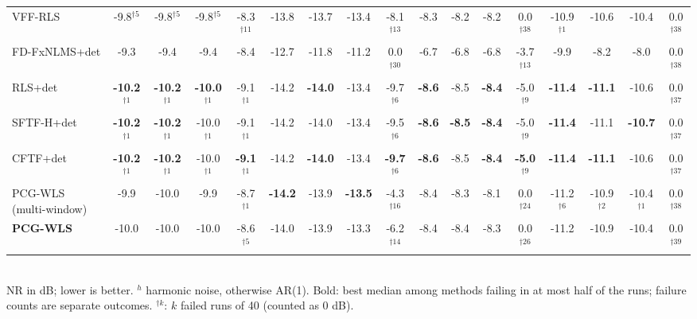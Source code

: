 \begin{table}[t]
{\begin{tabular}{lcccccccccccccccc}
VFF-RLS & -9.8$^{\dagger5}$ & -9.8$^{\dagger5}$ & -9.8$^{\dagger5}$ & -8.3$^{\dagger11}$ & -13.8 & -13.7 & -13.4 & -8.1$^{\dagger13}$ & -8.3 & -8.2 & -8.2 & 0.0$^{\dagger38}$ & -10.9$^{\dagger1}$ & -10.6 & -10.4 & 0.0$^{\dagger38}$ \\
FD-FxNLMS+det & -9.3 & -9.4 & -9.4 & -8.4 & -12.7 & -11.8 & -11.2 & 0.0$^{\dagger30}$ & -6.7 & -6.8 & -6.8 & -3.7$^{\dagger13}$ & -9.9 & -8.2 & -8.0 & 0.0$^{\dagger38}$ \\
RLS+det & \textbf{-10.2$^{\dagger1}$} & \textbf{-10.2$^{\dagger1}$} & \textbf{-10.0$^{\dagger1}$} & -9.1$^{\dagger1}$ & -14.2 & \textbf{-14.0} & -13.4 & -9.7$^{\dagger6}$ & \textbf{-8.6} & -8.5 & \textbf{-8.4} & -5.0$^{\dagger9}$ & \textbf{-11.4} & \textbf{-11.1} & -10.6 & 0.0$^{\dagger37}$ \\
SFTF-H+det & \textbf{-10.2$^{\dagger1}$} & \textbf{-10.2$^{\dagger1}$} & -10.0$^{\dagger1}$ & -9.1$^{\dagger1}$ & -14.2 & -14.0 & -13.4 & -9.5$^{\dagger6}$ & \textbf{-8.6} & \textbf{-8.5} & \textbf{-8.4} & -5.0$^{\dagger9}$ & \textbf{-11.4} & -11.1 & \textbf{-10.7} & 0.0$^{\dagger37}$ \\
CFTF+det & \textbf{-10.2$^{\dagger1}$} & \textbf{-10.2$^{\dagger1}$} & -10.0$^{\dagger1}$ & \textbf{-9.1$^{\dagger1}$} & -14.2 & \textbf{-14.0} & -13.4 & \textbf{-9.7$^{\dagger6}$} & \textbf{-8.6} & -8.5 & \textbf{-8.4} & \textbf{-5.0$^{\dagger9}$} & \textbf{-11.4} & \textbf{-11.1} & -10.6 & 0.0$^{\dagger37}$ \\
PCG-WLS (multi-window) & -9.9 & -10.0 & -9.9 & -8.7$^{\dagger1}$ & \textbf{-14.2} & -13.9 & \textbf{-13.5} & -4.3$^{\dagger16}$ & -8.4 & -8.3 & -8.1 & 0.0$^{\dagger24}$ & -11.2$^{\dagger6}$ & -10.9$^{\dagger2}$ & -10.4$^{\dagger1}$ & 0.0$^{\dagger38}$ \\
\textbf{PCG-WLS} & -10.0 & -10.0 & -10.0 & -8.6$^{\dagger5}$ & -14.0 & -13.9 & -13.3 & -6.2$^{\dagger14}$ & -8.4 & -8.4 & -8.3 & 0.0$^{\dagger26}$ & -11.2 & -10.9 & -10.4 & 0.0$^{\dagger39}$ \\
\bottomrule
\end{tabular}}
\\[2pt]{\scriptsize NR in dB; lower is better. $^h$ harmonic noise, otherwise AR(1). Bold: best median among methods failing in at most half of the runs; failure counts are separate outcomes. $^{\dagger k}$: $k$ failed runs of 40 (counted as 0 dB).}
\end{table}
